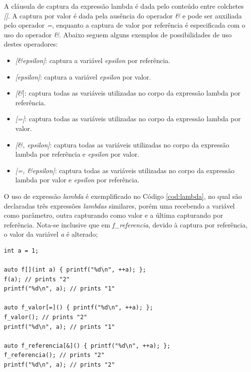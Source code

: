 A cláusula de captura da expressão lambda é dada pelo conteúdo entre colchetes
\textit{[]}. A captura por valor é dada pela ausência do operador \textit{\&} e
pode ser auxiliada pelo operador \textit{=}, enquanto a captura de valor por
referência é especificada com o uso do operador \textit{\&}. Abaixo seguem
alguns exemplos de possibilidades de uso destes operadores:

\begin{itemize}
  \item \textit{[\&epsilon]}: captura a variável \textit{epsilon} por
        referência.
  \item \textit{[epsilon]}: captura a variável \textit{epsilon} por valor.
  \item \textit{[\&}]: captura todas as variáveis utilizadas no corpo da
        expressão lambda por referência.
  \item \textit{[=]}: captura todas as variáveis utilizadas no corpo da
        expressão lambda por valor.
  \item \textit{[\&, epsilon]}: captura todas as variáveis utilizadas no corpo
        da expressão lambda por referência e \textit{epsilon} por valor.
  \item \textit{[=, \&epsilon]}: captura todas as variáveis utilizadas no corpo
        da expressão lambda por valor e \textit{epsilon} por referência.
\end{itemize}

O uso de expressão \textit{lambda} é exemplificado no Código \ref{cod:lambda},
no qual são declaradas três expressões \textit{lambdas} similares, porém uma
recebendo a variável como parâmetro, outra capturando como valor e a última
capturando por referência. Nota-se inclusive que em \textit{f\_referencia},
devido à captura por referência, o valor da variável \textit{a} é alterado;

\begin{lstlisting}[caption = {Caso de uso de expressões \textit{lambda}}, float=htb,
source = {Autoria própria},
label = {cod:lambda}]
int a = 1;

auto f[](int a) { printf("%d\n", ++a); };
f(a); // prints "2"
printf("%d\n", a); // prints "1"

auto f_valor[=]() { printf("%d\n", ++a); };
f_valor(); // prints "2"
printf("%d\n", a); // prints "1"

auto f_referencia[&]() { printf("%d\n", ++a); };
f_referencia(); // prints "2"
printf("%d\n", a); // prints "2"
\end{lstlisting}

